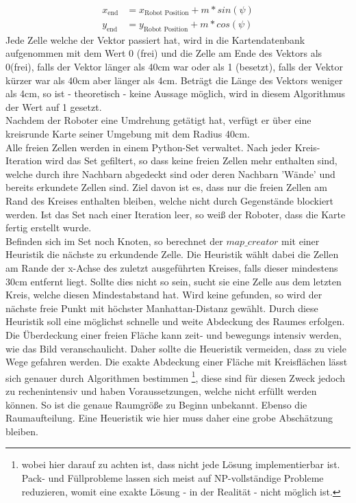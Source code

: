 \documentclass[twoside,12pt,a4paper]{report}
\begin{document}
	\begin{align}
	x_\text{end} &= x_\text{Robot Position} + m * sin(\psi)\\
	y_\text{end} &= y_\text{Robot Position} + m * cos(\psi)
	\end{align}
	Jede Zelle welche der Vektor passiert hat, wird in die Kartendatenbank aufgenommen mit dem Wert 0 (frei) und die Zelle am Ende des Vektors als 0(frei), falls der Vektor länger als 40cm war oder als 1 (besetzt), falls der Vektor kürzer war als 40cm aber länger als 4cm. Beträgt die Länge des Vektors weniger als 4cm, so ist - theoretisch - keine Aussage möglich, wird in diesem Algorithmus der Wert auf 1 gesetzt. \\
	Nachdem der Roboter eine Umdrehung getätigt hat, verfügt er über eine kreisrunde Karte seiner Umgebung mit dem Radius 40cm. \\
	Alle freien Zellen werden in einem Python-Set verwaltet. Nach jeder Kreis-Iteration wird das Set gefiltert, so dass keine freien Zellen mehr enthalten sind, welche durch ihre Nachbarn abgedeckt sind oder deren Nachbarn 'Wände' und bereits erkundete Zellen sind. Ziel davon ist es, dass nur die freien Zellen am Rand des Kreises enthalten bleiben, welche nicht durch Gegenstände blockiert werden. Ist das Set nach einer Iteration leer, so weiß der Roboter, dass die Karte fertig erstellt wurde. \\
	Befinden sich im Set noch Knoten, so berechnet der $map\_creator$ mit einer Heuristik die nächste zu erkundende Zelle. Die Heuristik wählt dabei die Zellen am Rande der x-Achse des zuletzt ausgeführten Kreises, falls dieser mindestens 30cm entfernt liegt. Sollte dies nicht so sein, sucht sie eine Zelle aus dem letzten Kreis, welche diesen Mindestabstand hat. Wird keine gefunden, so wird der nächste freie Punkt mit höchster Manhattan-Distanz gewählt. Durch diese Heuristik soll eine möglichst schnelle und weite Abdeckung des Raumes erfolgen. \\
	Die Überdeckung einer freien Fläche kann zeit- und bewegungs intensiv werden, wie das Bild veranschaulicht. Daher sollte die Heueristik vermeiden, dass zu viele Wege gefahren werden. Die exakte Abdeckung einer Fläche mit Kreisflächen lässt sich genauer durch Algorithmen bestimmen \footnote{wobei hier darauf zu achten ist, dass nicht jede Lösung implementierbar ist. Pack- und Füllprobleme lassen sich meist auf NP-vollständige Probleme reduzieren, womit eine exakte Lösung - in der Realität -  nicht möglich ist. }, diese sind für diesen Zweck jedoch zu rechenintensiv und haben Voraussetzungen, welche nicht erfüllt werden können. So ist die genaue Raumgröße zu Beginn unbekannt. Ebenso die Raumaufteilung. Eine Heueristik wie hier muss daher eine grobe Abschätzung bleiben. 
\end{document}
